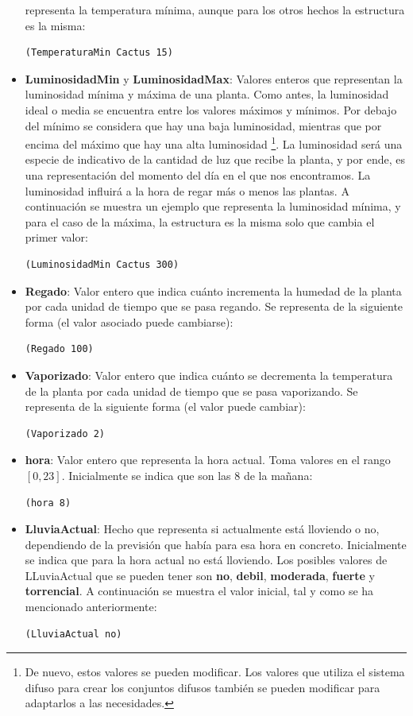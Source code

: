 \documentclass[11pt,a4paper]{article}
\begin{document}
\begin{itemize}
	representa la temperatura mínima, aunque para los otros hechos la estructura es la misma:
\begin{lstlisting}
(TemperaturaMin Cactus 15)
\end{lstlisting}
	\item \textbf{LuminosidadMin} y \textbf{LuminosidadMax}: Valores enteros que representan la luminosidad mínima y máxima de
	una planta. Como antes, la luminosidad ideal o media se encuentra entre los valores máximos y mínimos. Por debajo del mínimo
	se considera que hay una baja luminosidad, mientras que por encima del máximo que hay una alta luminosidad \footnote{De nuevo,
	estos valores se pueden modificar. Los valores que utiliza el sistema difuso para crear los conjuntos difusos también se pueden
	modificar para adaptarlos a las necesidades.}.	La luminosidad será una especie
	de indicativo de la cantidad de luz que recibe la planta, y por ende, es una representación del momento del día en el que nos
	encontramos. La luminosidad influirá a la hora de regar más o menos las plantas. A continuación se muestra un ejemplo que
	representa la luminosidad mínima, y para el caso de la máxima, la estructura es la misma solo que cambia el primer valor:
\begin{lstlisting}
(LuminosidadMin Cactus 300)
\end{lstlisting}
	\item \textbf{Regado}: Valor entero que indica cuánto incrementa la humedad de la planta por cada unidad de tiempo que se pasa
	regando. Se representa de la siguiente forma (el valor asociado puede cambiarse):
\begin{lstlisting}
(Regado 100)
\end{lstlisting}
	\item \textbf{Vaporizado}: Valor entero que indica cuánto se decrementa la temperatura de la planta por cada unidad de tiempo
	que se pasa vaporizando. Se representa de la siguiente forma (el valor puede cambiar):
\begin{lstlisting}
(Vaporizado 2)
\end{lstlisting}
	\item \textbf{hora}: Valor entero que representa la hora actual. Toma valores en el rango $[0, 23]$. Inicialmente se indica que
	son las 8 de la mañana:
\begin{lstlisting}
(hora 8)
\end{lstlisting}
	\item \textbf{LluviaActual}: Hecho que representa si actualmente está lloviendo o no, dependiendo de la previsión que había
	para esa hora en concreto. Inicialmente se indica que para la hora actual no está lloviendo. Los posibles valores de LLuviaActual
	que se pueden tener son \textbf{no}, \textbf{debil}, \textbf{moderada}, \textbf{fuerte} y \textbf{torrencial}. A continuación
	se muestra el valor inicial, tal y como se ha mencionado anteriormente:
\begin{lstlisting}
(LluviaActual no)
\end{lstlisting}
\end{itemize}
\end{document}
